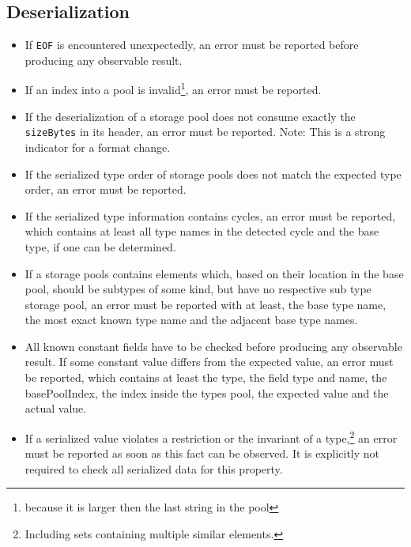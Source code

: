 \documentclass[a4paper,10pt]{article}
\begin{document}
\subsection*{Deserialization}
\begin{itemize}
\item If \texttt{EOF} is encountered unexpectedly, an error must be reported before producing any observable result.

\item If an index into a pool is invalid\footnote{because it is larger then the last string in the pool}, an error must be reported.

\item If the deserialization of a storage pool does not consume exactly the \texttt{sizeBytes} in its header, an error must be reported. Note: This is a strong indicator for a format change.

\item If the serialized type order of storage pools does not match the expected type order, an error must be reported.

\item If the serialized type information contains cycles, an error must be reported, which contains at least all type names in the detected cycle and the base type, if one can be determined.

\item If a storage pools contains elements which, based on their location in the base pool, should be subtypes of some kind, but have no respective sub type storage pool, an error must be reported with at least, the base type name, the most exact known type name and the adjacent base type names.

\item All known constant fields have to be checked before producing any observable result. If some constant value differs from the expected value, an error must be reported, which contains at least the type, the field type and name, the basePoolIndex, the index inside the types pool, the expected value and the actual value.

\item If a serialized value violates a restriction or the invariant of a type,\footnote{Including sets containing multiple similar elements.} an error must be reported as soon as this fact can be observed. It is explicitly not required to check all serialized data for this property.
\end{itemize}
\end{document}

